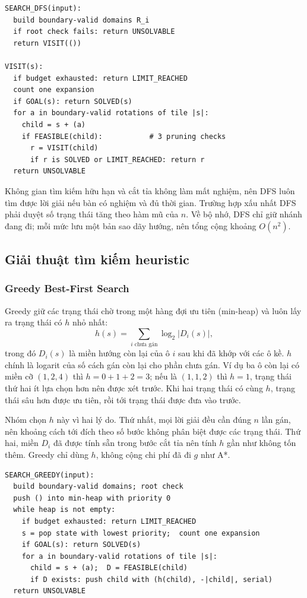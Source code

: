 \noindent\begin{minipage}{\textwidth}
\begin{lstlisting}
SEARCH_DFS(input):
  build boundary-valid domains R_i
  if root check fails: return UNSOLVABLE
  return VISIT(())

VISIT(s):
  if budget exhausted: return LIMIT_REACHED
  count one expansion
  if GOAL(s): return SOLVED(s)
  for a in boundary-valid rotations of tile |s|:
    child = s + (a)
    if FEASIBLE(child):           # 3 pruning checks
      r = VISIT(child)
      if r is SOLVED or LIMIT_REACHED: return r
  return UNSOLVABLE
\end{lstlisting}
\end{minipage}

Không gian tìm kiếm hữu hạn và cắt tỉa không làm mất nghiệm, nên DFS luôn tìm
được lời giải nếu bàn có nghiệm và đủ thời gian. Trường hợp xấu nhất DFS phải
duyệt số trạng thái tăng theo hàm mũ của $n$. Về bộ nhớ, DFS chỉ giữ nhánh đang
đi; mỗi mức lưu một bản sao dãy hướng, nên tổng cộng khoảng $O(n^2)$.

\subsection{Giải thuật tìm kiếm heuristic}
\subsubsection*{Greedy Best-First Search}

Greedy giữ các trạng thái chờ trong một hàng đợi ưu tiên (min-heap) và luôn
lấy ra trạng thái có $h$ nhỏ nhất:
\[
h(s)=\sum_{i\text{ chưa gán}}\log_2|D_i(s)|,
\]
trong đó $D_i(s)$ là miền hướng còn lại của ô $i$ sau khi đã khớp với các ô kề.
$h$ chính là logarit của số cách gán còn lại cho phần chưa gán. Ví dụ ba ô
còn lại có miền cỡ $(1,2,4)$ thì $h=0+1+2=3$; nếu là $(1,1,2)$ thì $h=1$,
trạng thái thứ hai ít lựa chọn hơn nên được xét trước. Khi hai trạng thái có
cùng $h$, trạng thái sâu hơn được ưu tiên, rồi tới trạng thái được đưa vào trước.

Nhóm chọn $h$ này vì hai lý do. Thứ nhất, mọi lời giải đều cần đúng $n$ lần gán,
nên khoảng cách tới đích theo số bước không phân biệt được các trạng thái.
Thứ hai, miền $D_i$ đã được tính sẵn trong bước cắt tỉa nên tính $h$ gần như
không tốn thêm. Greedy chỉ dùng $h$, không cộng chi phí đã đi $g$ như A*.

\noindent\begin{minipage}{\textwidth}
\begin{lstlisting}
SEARCH_GREEDY(input):
  build boundary-valid domains; root check
  push () into min-heap with priority 0
  while heap is not empty:
    if budget exhausted: return LIMIT_REACHED
    s = pop state with lowest priority;  count one expansion
    if GOAL(s): return SOLVED(s)
    for a in boundary-valid rotations of tile |s|:
      child = s + (a);  D = FEASIBLE(child)
      if D exists: push child with (h(child), -|child|, serial)
  return UNSOLVABLE
\end{lstlisting}
\end{minipage}

